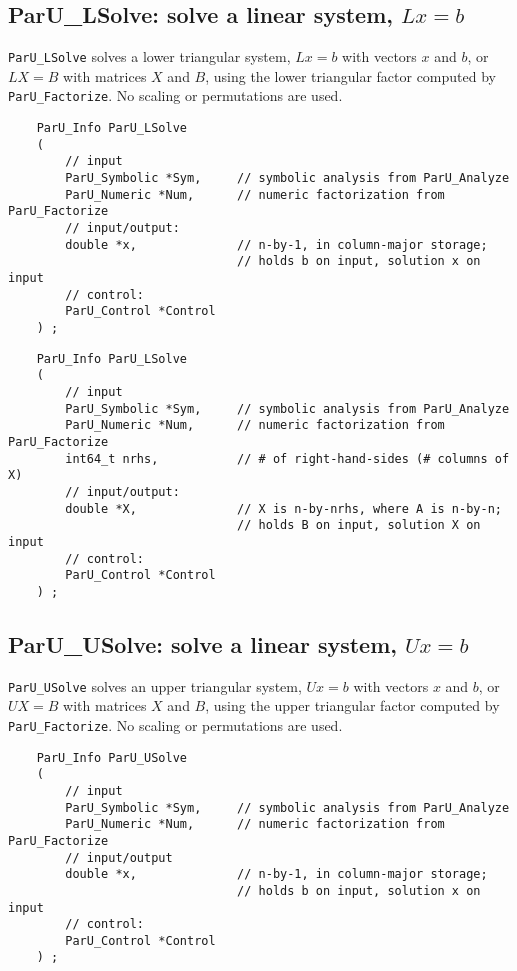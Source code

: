 \documentclass[12pt]{article}
\begin{document}
\subsection{{\sf ParU\_LSolve}: solve a linear system, $Lx=b$}

    \verb'ParU_LSolve' solves a lower triangular system, $Lx=b$ with vectors
    $x$ and $b$, or $LX=B$ with matrices $X$ and $B$, using the lower
    triangular factor computed by \verb'ParU_Factorize'.  No scaling or
    permutations are used.

    {\footnotesize
    \begin{verbatim}
    ParU_Info ParU_LSolve
    (
        // input
        ParU_Symbolic *Sym,     // symbolic analysis from ParU_Analyze
        ParU_Numeric *Num,      // numeric factorization from ParU_Factorize
        // input/output:
        double *x,              // n-by-1, in column-major storage;
                                // holds b on input, solution x on input
        // control:
        ParU_Control *Control
    ) ; \end{verbatim} }

    {\footnotesize
    \begin{verbatim}
    ParU_Info ParU_LSolve
    (
        // input
        ParU_Symbolic *Sym,     // symbolic analysis from ParU_Analyze
        ParU_Numeric *Num,      // numeric factorization from ParU_Factorize
        int64_t nrhs,           // # of right-hand-sides (# columns of X)
        // input/output:
        double *X,              // X is n-by-nrhs, where A is n-by-n;
                                // holds B on input, solution X on input
        // control:
        ParU_Control *Control
    ) ; \end{verbatim} }

\subsection{{\sf ParU\_USolve}: solve a linear system, $Ux=b$}

    \verb'ParU_USolve' solves an upper triangular system, $Ux=b$ with vectors
    $x$ and $b$, or $UX=B$ with matrices $X$ and $B$, using the upper
    triangular factor computed by \verb'ParU_Factorize'.  No scaling or
    permutations are used.

    {\footnotesize
    \begin{verbatim}
    ParU_Info ParU_USolve
    (
        // input
        ParU_Symbolic *Sym,     // symbolic analysis from ParU_Analyze
        ParU_Numeric *Num,      // numeric factorization from ParU_Factorize
        // input/output
        double *x,              // n-by-1, in column-major storage;
                                // holds b on input, solution x on input
        // control:
        ParU_Control *Control
    ) ; \end{verbatim} }
\end{document}
